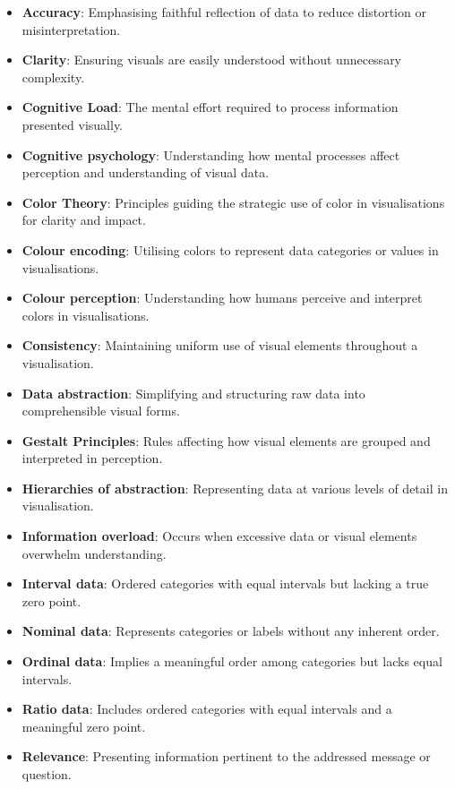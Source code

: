 \documentclass{article}\usepackage[]{graphicx}\usepackage[]{xcolor}
\numberwithin{equation}{section}
\begin{document}
{\begin{itemize}
    \item \textbf{Accuracy}: Emphasising faithful reflection of data to reduce distortion or misinterpretation.
    \item \textbf{Clarity}: Ensuring visuals are easily understood without unnecessary complexity.
    \item \textbf{Cognitive Load}: The mental effort required to process information presented visually.
    \item \textbf{Cognitive psychology}: Understanding how mental processes affect perception and understanding of visual data.
    \item \textbf{Color Theory}: Principles guiding the strategic use of color in visualisations for clarity and impact.
    \item \textbf{Colour encoding}: Utilising colors to represent data categories or values in visualisations.
    \item \textbf{Colour perception}: Understanding how humans perceive and interpret colors in visualisations.
    \item \textbf{Consistency}: Maintaining uniform use of visual elements throughout a visualisation.
    \item \textbf{Data abstraction}: Simplifying and structuring raw data into comprehensible visual forms.
    \item \textbf{Gestalt Principles}: Rules affecting how visual elements are grouped and interpreted in perception.
    \item \textbf{Hierarchies of abstraction}: Representing data at various levels of detail in visualisation.
    \item \textbf{Information overload}: Occurs when excessive data or visual elements overwhelm understanding.
    \item \textbf{Interval data}: Ordered categories with equal intervals but lacking a true zero point.
    \item \textbf{Nominal data}: Represents categories or labels without any inherent order.
    \item \textbf{Ordinal data}: Implies a meaningful order among categories but lacks equal intervals.
    \item \textbf{Ratio data}: Includes ordered categories with equal intervals and a meaningful zero point.
    \item \textbf{Relevance}: Presenting information pertinent to the addressed message or question.
\end{itemize}
  
}
\end{document}
